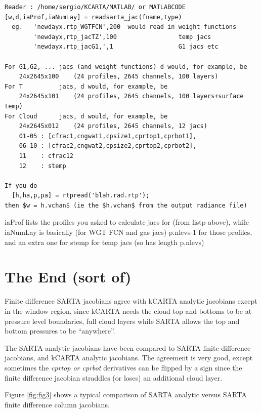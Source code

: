 \documentclass[11pt]{article}
\newcommand{\kc}{\textsf{kCARTA}\xspace}
\newcommand{\sa}{\textsf{SARTA}\xspace}
\begin{document}
\begin{verbatim}
Reader : /home/sergio/KCARTA/MATLAB/ or MATLABCODE
[w,d,iaProf,iaNumLay] = readsarta_jac(fname,type)
  eg.   'newdayx.rtp_WGTFCN',200  would read in weight functions
        'newdayx,rtp_jacTZ',100                 temp jacs 
        'newdayx.rtp_jacG1,',1                  G1 jacs etc

For G1,G2, ... jacs (and weight functions) d would, for example, be
    24x2645x100    (24 profiles, 2645 channels, 100 layers)
For T          jacs, d would, for example, be
    24x2645x101    (24 profiles, 2645 channels, 100 layers+surface temp)
For Cloud      jacs, d would, for example, be
    24x2645x012    (24 profiles, 2645 channels, 12 jacs)
    01-05 : [cfrac1,cngwat1,cpsize1,cprtop1,cprbot1],
    06-10 : [cfrac2,cngwat2,cpsize2,cprtop2,cprbot2],
    11    : cfrac12
    12    : stemp 

If you do
  [h,ha,p,pa] = rtpread('blah.rad.rtp');
then $w = h.vchan$ (ie the $h.vchan$ from the output radiance file)
\end{verbatim} 

iaProf lists the profiles you asked to calculate jacs for (from listp
above), while iaNumLay is basically (for WGT FCN and gas jacs)
p.nlevs-1 for those profiles, and an extra one for stemp for temp jacs
(so has length p.nlevs)

\section{The End (sort of)}

Finite difference \sa jacobians agree with kCARTA analytic jacobians
except in the window region, since \kc needs the cloud top and bottoms
to be at pressure level boundaries, full cloud layers while \sa allows
the top and bottom pressures to be ``anywhere''. 

The \sa analytic jacobians have been compared to \sa finite difference
jacobians, and kCARTA analytic jacobians. The agreement is very good,
except sometimes the \textit{cprtop or cprbot} derivatives can be
flipped by a sign since the finite difference jacobian straddles (or
loses) an additional cloud layer.

Figure \ref{fig:fig3} shows a typical comparison of \sa analytic
versus \sa finite difference column jacobians.
\end{document}
